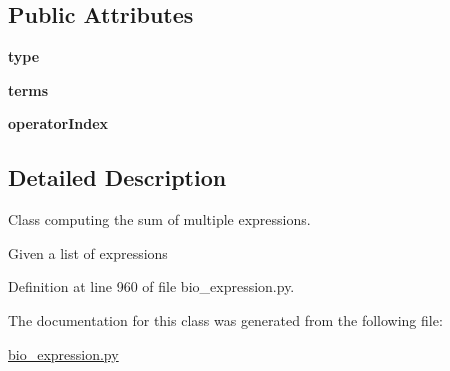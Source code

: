 \subsection*{Public Attributes}
\begin{DoxyCompactItemize}
\item 
{\bfseries type}\hypertarget{classbio__expression_1_1bio_mult_sum_a725774ff889a9b510ae8710ae1931461}{}\label{classbio__expression_1_1bio_mult_sum_a725774ff889a9b510ae8710ae1931461}

\item 
{\bfseries terms}\hypertarget{classbio__expression_1_1bio_mult_sum_ac2578c75d1fe522acb4fcf63e7be9161}{}\label{classbio__expression_1_1bio_mult_sum_ac2578c75d1fe522acb4fcf63e7be9161}

\item 
{\bfseries operator\+Index}\hypertarget{classbio__expression_1_1bio_mult_sum_a0647bf214960ea95a89b9e2676362e77}{}\label{classbio__expression_1_1bio_mult_sum_a0647bf214960ea95a89b9e2676362e77}

\end{DoxyCompactItemize}


\subsection{Detailed Description}
Class computing the sum of multiple expressions. 

Given a list of expressions 

Definition at line 960 of file bio\+\_\+expression.\+py.



The documentation for this class was generated from the following file\+:\begin{DoxyCompactItemize}
\item 
\hyperlink{bio__expression_8py}{bio\+\_\+expression.\+py}\end{DoxyCompactItemize}
